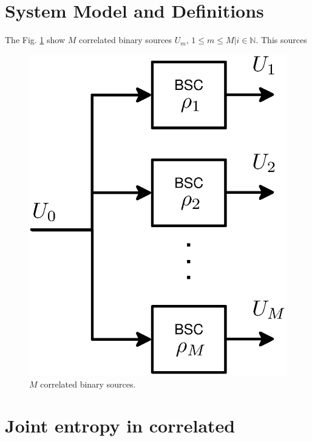 \documentclass[journal]{IEEEtran}
\begin{document}
\section{System Model and Definitions} \label{sec:SystemModel}

The Fig. \ref{fig:model} show $M$ correlated binary sources $U_m$, $1 \leq m \leq M| i \in \mathbb{N}$.
This sources

\label{sec:SystemModel}
\begin{figure}[!h]
  \centering
    \includegraphics[width=0.8\columnwidth]{sources.eps}
  \caption{$M$ correlated binary sources.}
    \label{fig:model}
\end{figure}

\section{Joint entropy in correlated } \label{sec:Joint}
\end{document}
